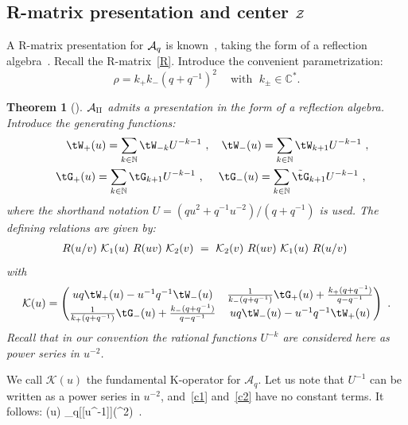 \documentclass[11pt]{amsart}
\numberwithin{equation}{section}
\newtheorem{thm}{Theorem}[section]
\numberwithin{equation}{section}
\begin{document}
\begin{appendix}
\subsection{R-matrix presentation and center $\cal Z$}\label{sec:RpresAq}	
		A R-matrix presentation for ${\cal A}_q$
		is known~\cite{BSh1}, taking  the form
	of a reflection algebra~\cite{Skly88}. Recall the R-matrix~\eqref{R}.  
	Introduce the convenient parametrization:
	\begin{equation}
		\rho=k_+k_-(q+q^{-1})^2\   \quad \text{with} \, \ \ k_\pm\in \mathbb{C}^*.  
		\label{rho}
	\end{equation}
	\begin{thm}[\cite{BSh1}]\label{def:Aq0} $\cal A_q$ admits a presentation in the form of a reflection algebra. Introduce the generating functions:
		\begin{align}
			{\tW}_+(u)=\sum_{k\in {\mathbb N}}{\normalfont \tW}_{-k}U^{-k-1} \ , \quad {\tW}_-(u)=\sum_{k\in  {\mathbb N}}{\normalfont \tW}_{k+1}U^{-k-1} \ ,\label{c1}\\
			\quad {\tG}_+(u)=\sum_{k\in {\mathbb N}}{\normalfont \tG}_{k+1}U^{-k-1} \ , \; \quad {\tG}_-(u)=\sum_{k\in {\mathbb N}}{\normalfont \tilde{{\tG}}_{k+1}}U^{-k-1} \ ,\label{c2} \; 
		\end{align}
		where the  shorthand notation  $U=(qu^2+q^{-1}u^{-2})/(q+q^{-1})$ is used. The defining relations are given by:
		\begin{align} 
			R(u/v)\ {\cal K}_1(u)\ R(uv)\ {\cal K}_2(v)\
			= \ {\cal K}_2(v)\  R(uv)\ {\cal K}_1(u)\ R(u/v)\ 
			\label{RE} 
		\end{align}
		with 		%
		\begin{equation}
			{\cal K}(u)=\begin{pmatrix} 
				uq \tW_+(u)-u^{-1}q^{-1}\tW_-(u) &\frac{1}{k_-(q+q^{-1})}\tG_+(u)+\frac{k_+(q+q^{-1})}{q-q^{-1}} \\ 
				\frac{1}{k_+(q+q^{-1})}\tG_-(u) +\frac{k_-(q+q^{-1})}{q-q^{-1}}& uq \tW_-(u) -u^{-1}q^{-1}\tW_+(u) 
			\end{pmatrix}  \label{K-Aq} \ .
		\end{equation}
		Recall that in our convention  the rational functions $U^{-k}$ are considered here as power series in $u^{-2}$.
	\end{thm}
%
	We call $\mathcal{K}(u)$ the fundamental K-operator for $\mathcal{A}_q$. Let us note that $U^{-1}$ can be written as a power series in $u^{-2}$, and~\eqref{c1} and~\eqref{c2} have no constant terms. It follows:
	\beqa
	(u) \in {}_q[[u^{-1}]]\otimes \End(^2)\ .\label{K-Aqexp}
	\eeqa


\end{appendix}
\end{document}
